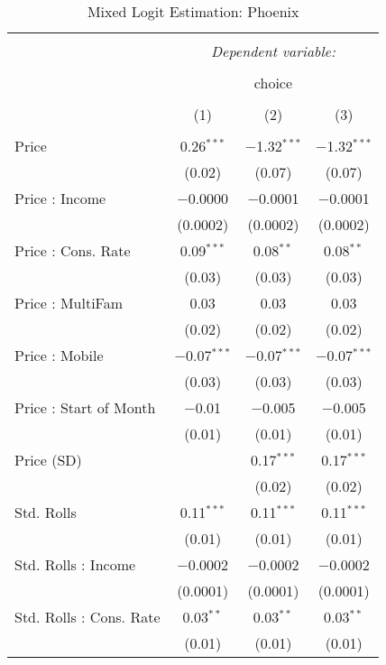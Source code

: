 
\begin{table}[!htbp] \centering 
  \caption{Mixed Logit Estimation: Phoenix} 
  \label{tab:mnlPhoenixRandCoef} 
\begin{tabular}{@{\extracolsep{5pt}}lccc} 
\\[-1.8ex]\hline 
\hline \\[-1.8ex] 
 & \multicolumn{3}{c}{\textit{Dependent variable:}} \\ 
\cline{2-4} 
\\[-1.8ex] & \multicolumn{3}{c}{choice} \\ 
\\[-1.8ex] & (1) & (2) & (3)\\ 
\hline \\[-1.8ex] 
 Price & 0.26$^{***}$ & $-$1.32$^{***}$ & $-$1.32$^{***}$ \\ 
  & (0.02) & (0.07) & (0.07) \\ 
  Price : Income & $-$0.0000 & $-$0.0001 & $-$0.0001 \\ 
  & (0.0002) & (0.0002) & (0.0002) \\ 
  Price : Cons. Rate & 0.09$^{***}$ & 0.08$^{**}$ & 0.08$^{**}$ \\ 
  & (0.03) & (0.03) & (0.03) \\ 
  Price : MultiFam & 0.03 & 0.03 & 0.03 \\ 
  & (0.02) & (0.02) & (0.02) \\ 
  Price : Mobile & $-$0.07$^{***}$ & $-$0.07$^{***}$ & $-$0.07$^{***}$ \\ 
  & (0.03) & (0.03) & (0.03) \\ 
  Price : Start of Month & $-$0.01 & $-$0.005 & $-$0.005 \\ 
  & (0.01) & (0.01) & (0.01) \\ 
  Price (SD) &  & 0.17$^{***}$ & 0.17$^{***}$ \\ 
  &  & (0.02) & (0.02) \\ 
  Std. Rolls & 0.11$^{***}$ & 0.11$^{***}$ & 0.11$^{***}$ \\ 
  & (0.01) & (0.01) & (0.01) \\ 
  Std. Rolls : Income & $-$0.0002 & $-$0.0002 & $-$0.0002 \\ 
  & (0.0001) & (0.0001) & (0.0001) \\ 
  Std. Rolls : Cons. Rate & 0.03$^{**}$ & 0.03$^{**}$ & 0.03$^{**}$ \\ 
  & (0.01) & (0.01) & (0.01) \\ 

\end{tabular}
\end{table}
